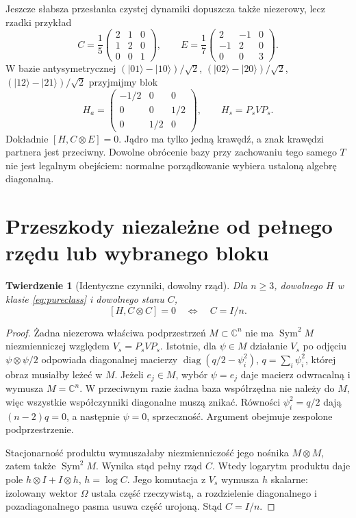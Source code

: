 \documentclass[11pt,a4paper]{article}
\newtheorem{theorem}{Twierdzenie}
\begin{document}
Jeszcze słabsza przesłanka czystej dynamiki dopuszcza także niezerowy,
lecz rzadki przykład
\begin{equation}\label{eq:matchingexample}
 C=\frac15\begin{pmatrix}2&1&0\\1&2&0\\0&0&1\end{pmatrix},\qquad
 E=\frac17\begin{pmatrix}2&-1&0\\-1&2&0\\0&0&3\end{pmatrix}.
\end{equation}
W bazie antysymetrycznej $(|01\rangle-|10\rangle)/\sqrt2$,
$(|02\rangle-|20\rangle)/\sqrt2$,
$(|12\rangle-|21\rangle)/\sqrt2$ przyjmijmy blok
\[
 H_a=\begin{pmatrix}-1/2&0&0\\0&0&1/2\\0&1/2&0\end{pmatrix},
 \qquad H_s=P_sVP_s.
\]
Dokładnie $[H,C\otimes E]=0$. Jądro ma tylko jedną krawędź,
a znak krawędzi partnera jest przeciwny. Dowolne obrócenie bazy
przy zachowaniu tego samego $T$ nie jest legalnym obejściem:
normalne porządkowanie wybiera ustaloną algebrę diagonalną.

\section{Przeszkody niezależne od pełnego rzędu lub wybranego bloku}

\begin{theorem}[Identyczne czynniki, dowolny rząd]\label{thm:rankfree}
Dla $n\ge3$, dowolnego $H$ w klasie \eqref{eq:pureclass} i dowolnego
stanu $C$,
\[
 [H,C\otimes C]=0\quad\Longleftrightarrow\quad C=I/n.
\]
\end{theorem}

\begin{proof}
Żadna niezerowa właściwa podprzestrzeń $M\subset\mathbb C^n$ nie ma
$\operatorname{Sym}^2M$ niezmienniczej względem $V_s=P_sVP_s$.
Istotnie, dla $\psi\in M$ działanie $V_s$ po odjęciu
$\psi\otimes\psi/2$ odpowiada diagonalnej macierzy
$\operatorname{diag}(q/2-\psi_i^2)$, $q=\sum_i\psi_i^2$,
której obraz musiałby leżeć w $M$.
Jeżeli $e_j\in M$, wybór $\psi=e_j$ daje macierz odwracalną
i wymusza $M=\mathbb C^n$. W przeciwnym razie żadna baza współrzędna
nie należy do $M$, więc wszystkie współczynniki diagonalne muszą
znikać. Równości $\psi_i^2=q/2$ dają $(n-2)q=0$, a następnie
$\psi=0$, sprzeczność. Argument obejmuje zespolone podprzestrzenie.

Stacjonarność produktu wymuszałaby niezmienniczość jego nośnika
$M\otimes M$, zatem także $\operatorname{Sym}^2M$.
Wynika stąd pełny rząd $C$. Wtedy logarytm produktu daje pole
$h\otimes I+I\otimes h$, $h=\log C$. Jego komutacja z $V_s$
wymusza $h$ skalarne: izolowany wektor $\Omega$ ustala część
rzeczywistą, a rozdzielenie diagonalnego i pozadiagonalnego pasma
usuwa część urojoną. Stąd $C=I/n$.
\end{proof}
\end{document}
